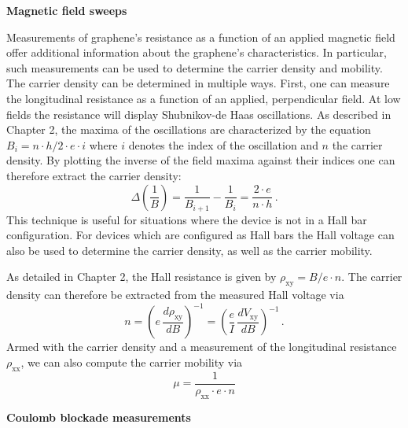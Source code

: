 \documentclass[edeposit,fullpage,draftthesis]{uiucthesis2009}
\begin{document}
            \textbf{Magnetic field sweeps}
            
            Measurements of graphene's resistance as a function of an applied magnetic field offer
            additional information about the graphene's characteristics. In particular, such measurements
            can be used to determine the carrier density and mobility.
            The carrier density can be determined in multiple ways. First, one can measure the
            longitudinal resistance as a function of an applied, perpendicular field. At low fields
            the resistance will display Shubnikov-de Haas oscillations. As described in Chapter 2, the 
            maxima of the oscillations are characterized by the equation $B_i = n \cdot h / 2 \cdot e \cdot i$
            where $i$ denotes the index of the oscillation and $n$ the carrier density. 
            By plotting the inverse of the field maxima against their indices one can therefore extract the carrier density:
            \begin{equation}
                \Delta\left(\frac{1}{B}\right) = \frac{1}{B_{i+1}}-\frac{1}{B_i} = \frac{2 \cdot e}{n\cdot h}\,.
            \end{equation}
            This technique is useful for situations where the device is not in a Hall bar configuration. For
            devices which are configured as Hall bars the Hall voltage can also be used to determine the carrier
            density, as well as the carrier mobility.
            
            As detailed in Chapter 2, the Hall resistance is given by $\rho_\text{xy} = B / e \cdot n$.
            The carrier density can therefore be extracted from the measured Hall voltage via 
            \begin{equation}
                n = \left(e \, \frac{d\rho_\text{xy}}{dB}\right)^{-1} = \left(\frac{e}{I} \, \frac{dV_\text{xy}}{dB}\right)^{-1} \,.
            \end{equation}
            Armed with the carrier density and a measurement of the longitudinal resistance $\rho_\text{xx}$,
            we can also compute the carrier mobility via
            \begin{equation}
                \mu = \frac{1}{\rho_\text{xx} \cdot e \cdot n}
            \end{equation}
            
    
            \textbf{Coulomb blockade measurements}
    
\end{document}
